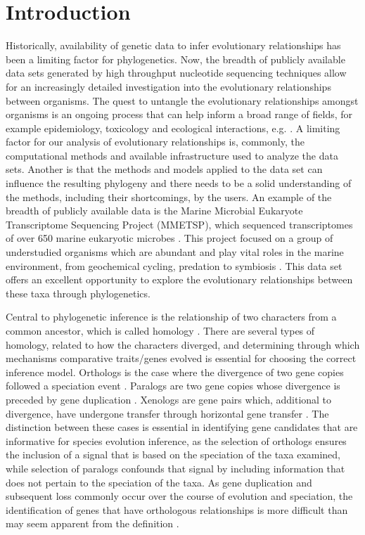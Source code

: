 \documentclass[12pt]{article}
\begin{document}
\section{Introduction}
Historically, availability of genetic data to infer evolutionary relationships has been a limiting factor for phylogenetics.
Now, the breadth of publicly available data sets generated by high throughput nucleotide sequencing techniques allow for an increasingly detailed investigation into the evolutionary relationships between organisms.
The quest to untangle the evolutionary relationships amongst organisms is an ongoing process that can help inform a broad range of fields, for example epidemiology, toxicology and ecological interactions, e.g. \cite{mctavish2017and,lewis2008episodic,mutreja2011evidence,cavender2009merging,sites2011phylogenetic}.
A limiting factor for our analysis of evolutionary relationships is, commonly, the computational methods and available infrastructure used to analyze the data sets. 
Another is that the methods and models applied to the data set can influence the resulting phylogeny and there needs to be a solid understanding of the methods, including their shortcomings, by the users.
An example of the breadth of publicly available data is the Marine Microbial Eukaryote Transcriptome Sequencing Project (MMETSP), which sequenced transcriptomes of over 650 marine eukaryotic microbes \cite{keeling2014marine}. 
This project focused on a group of understudied organisms which are abundant and play vital roles in the marine environment, from geochemical cycling, predation to symbiosis \cite{gomez2005list,gomez2012quantitative}. 
This data set offers an excellent opportunity to explore the evolutionary relationships between these taxa through phylogenetics. 

Central to phylogenetic inference is the relationship of two characters from a common ancestor, which is called homology \cite{fitch2000homology}. 
There are several types of homology, related to how the characters diverged, and determining through which mechanisms comparative traits/genes evolved is essential for choosing the correct inference model. 
Orthologs is the case where the divergence of two gene copies followed a speciation event \cite{fitch1970distinguishing}. 
Paralogs are two gene copies whose divergence is preceded by gene duplication \cite{fitch1970distinguishing}.
Xenologs are gene pairs which, additional to divergence, have undergone transfer through horizontal gene transfer \cite{darby2016xenolog}.
The distinction between these cases is essential in identifying gene candidates that are informative for species evolution inference, as the selection of orthologs ensures the inclusion of a signal that is based on the speciation of the taxa examined, while selection of paralogs confounds that signal by including information that does not pertain to the speciation of the taxa. 
As gene duplication and subsequent loss commonly occur over the course of evolution and speciation, the identification of genes that have orthologous relationships is more difficult than may seem apparent from the definition \cite{gabaldon2008large}. 
\end{document}
